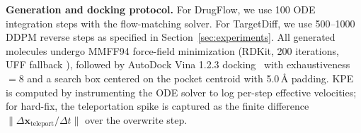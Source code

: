 \documentclass{article}
\begin{document}
\vspace{4pt}
\noindent\textbf{Generation and docking protocol.}
For DrugFlow, we use 100 ODE integration steps with the flow-matching
solver.  For TargetDiff, we use 500--1000 DDPM reverse steps as specified
in Section~\ref{sec:experiments}.  All generated molecules undergo MMFF94
force-field minimization (RDKit, 200 iterations, UFF fallback
\cite{halgren1996mmff94,rappe1992uff}), followed by AutoDock Vina 1.2.3
docking~\cite{trott2010vina} with exhaustiveness $=8$ and a search box
centered on the pocket centroid with 5.0\,\AA{} padding.  KPE is computed
by instrumenting the ODE solver to log per-step effective velocities; for
hard-fix, the teleportation spike is captured as the finite difference
$\|\Delta\bm{x}_{\text{teleport}} / \Delta t\|$ over the overwrite step.



\end{document}
